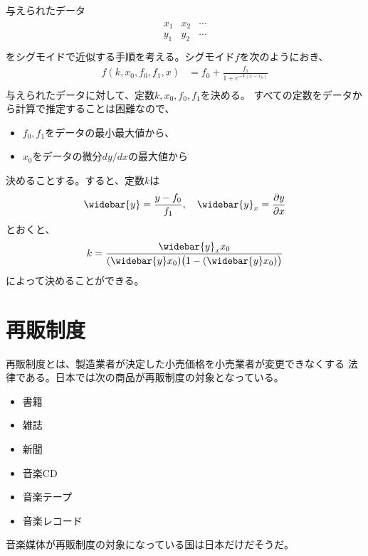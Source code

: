 	与えられたデータ
	\begin{equation*}\begin{split} %
		\begin{matrix}
		x_1 & x_2 & \cdots \\
		y_1 & y_2 & \cdots \\
		\end{matrix}
	\end{split}\end{equation*} %
	をシグモイドで近似する手順を考える。シグモイド$f$を次のようにおき、
	\begin{equation*}\begin{split} %
		f(k,x_0,f_0, f_1,x) &= f_0 + \frac{f_1}{1+e^{-k(x-x_0)}} \\
	\end{split}\end{equation*} %
	与えられたデータに対して、定数$k,x_0,f_0,f_1$を決める。
	すべての定数をデータから計算で推定することは困難なので、
	\begin{itemize}\setlength{\itemsep}{-1mm} %
		\item $f_0,f_1$をデータの最小最大値から、
		\item $x_0$をデータの微分$dy/dx$の最大値から
	\end{itemize} %
	決めることする。すると、定数$k$は
	\begin{equation*}\begin{split} %
		\widebar{y}=\frac{y-f_0}{f_1}
		,\quad \widebar{y}_x=\frac{\partial y}{\partial x}
	\end{split}\end{equation*} %
	とおくと、
	\begin{equation*}\begin{split} %
		k &= \frac{\widebar{y}_xx_0}{(\widebar{y}x_0)\bigl(1-(\widebar{y}x_0)\bigr)} \\
	\end{split}\end{equation*} %
	によって決めることができる。

\section{再販制度}\label{s1:再販制度} %
	再販制度とは、製造業者が決定した小売価格を小売業者が変更できなくする
	法律である。日本では次の商品が再販制度の対象となっている。
	\begin{itemize}\setlength{\itemsep}{-1mm} %
		\item 書籍
		\item 雑誌
		\item 新聞
		\item 音楽CD
		\item 音楽テープ
		\item 音楽レコード
	\end{itemize} %
	音楽媒体が再販制度の対象になっている国は日本だけだそうだ。

